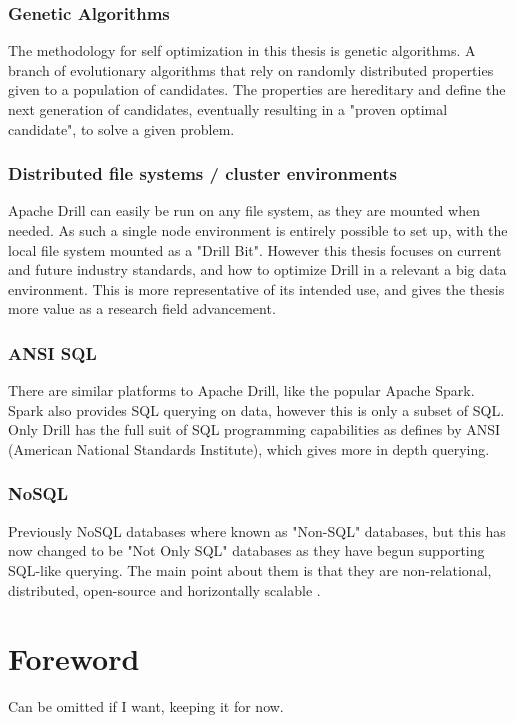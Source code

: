\documentclass[a4paper,english]{report}
\begin{document}
			\subsubsection{Genetic Algorithms}
			The methodology for self optimization in this thesis is genetic algorithms. A branch of evolutionary algorithms that rely on randomly distributed properties given to a population of candidates. The properties are hereditary and define the next generation of candidates, eventually resulting in a "proven optimal candidate", to solve a given problem.
			\subsubsection{Distributed file systems / cluster environments}
			Apache Drill can easily be run on any file system, as they are mounted when needed. As such a single node environment is entirely possible to set up, with the local file system mounted as a "Drill Bit". However this thesis focuses on current and future industry standards, and how to optimize Drill in a relevant a big data environment. This is more representative of its intended use, and gives the thesis more value as a research field advancement.
			\subsubsection{ANSI SQL}
			There are similar platforms to Apache Drill, like the popular Apache Spark. Spark also provides SQL querying on data, however this is only a subset of SQL. Only Drill has the full suit of SQL programming capabilities as defines by ANSI (American National Standards Institute), which gives more in depth querying.
			\subsubsection{NoSQL}
			Previously NoSQL databases where known as "Non-SQL" databases, but this has now changed to be "Not Only SQL" databases as they have begun supporting SQL-like querying. The main point about them is that they are non-relational, distributed, open-source and horizontally scalable \cite{no_sql}.
	
	\pagebreak
	\section{Foreword}
	Can be omitted if I want, keeping it for now.
	
	\tableofcontents
	
\end{document}
